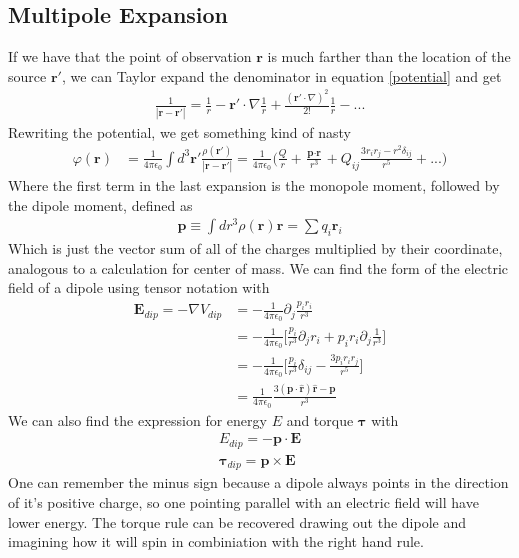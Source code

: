 \subsection{Multipole Expansion}
If we have that the point of observation $\textbf{r}$ is much farther than the location of the source $\textbf{r}'$, we can Taylor expand the denominator in equation \ref{potential} and get
\begin{align}
\frac{1}{|\textbf{r}-\textbf{r}'|} = \frac{1}{r} - \textbf{r}'\cdot\nabla\frac{1}{r} + \frac{(\textbf{r}'\cdot\nabla)^2}{2!}\frac{1}{r} - ...
\end{align}
Rewriting the potential, we get something kind of nasty
\begin{align}
\varphi(\textbf{r}) &= \frac{1}{4\pi\epsilon_0}\int d^3\textbf{r}' \frac{\rho(\textbf{r}')}{|\textbf{r}-\textbf{r}'|} = \frac{1}{4\pi\epsilon_0}
\Big(\frac{Q}{r} + \frac{\textbf{p}\cdot\textbf{r}}{r^3} + Q_{ij}\frac{3r_ir_j-r^2\delta_{ij}}{r^5} + ...\Big)
\end{align}
Where the first term in the last expansion is the monopole moment, followed by the dipole moment, defined as 
\begin{align}
\textbf{p} \equiv \int dr^3 \rho(\textbf{r}) \textbf{r} = \sum q_i\textbf{r}_i
\end{align}
Which is just the vector sum of all of the charges multiplied by their coordinate, analogous to a calculation for center of mass. We can find the form of the electric field of a dipole using tensor notation with
\begin{align}
\textbf{E}_{dip} = -\nabla V_{dip} &= -\frac{1}{4\pi\epsilon_0}\partial_j \frac{p_ir_i}{r^3}\\
&= - \frac{1}{4\pi\epsilon_0}\Big[\frac{p_i}{r^3}\partial_jr_i + p_ir_i\partial_j\frac{1}{r^3}\Big]\\
&= -\frac{1}{4\pi\epsilon_0} \Big[\frac{p_i}{r^3}\delta_{ij} -\frac{3p_ir_ir_j}{r^5}\Big]\\
&= \frac{1}{4\pi\epsilon_0} \frac{3(\textbf{p}\cdot\hat{\textbf{r}})\hat{\textbf{r}} - \textbf{p}}{r^3}
\end{align}
We can also find the expression for energy $E$ and torque $\boldsymbol{\tau}$ with
\begin{align}
E_{dip} = - \textbf{p}\cdot\textbf{E}\\
\mathbf{\tau}_{dip} = \textbf{p}\times\textbf{E}
\end{align}
One can remember the minus sign because a dipole always points in the direction of it's positive charge, so one pointing parallel with an electric field will have lower energy. The torque rule can be recovered drawing out the dipole and imagining how it will spin in combiniation with the right hand rule.

